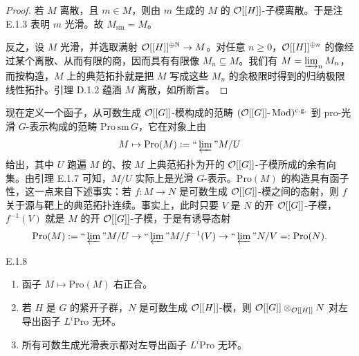 \begin{proof}
若 $M$ 离散，且 $m\in M$，则由 $m$ 生成的 $M$ 的 $\mathcal{O}[[H]]$-子模离散。于是注 E.1.3 表明 $m$ 光滑。故 $M_{\mathrm{sm}}=M$。

反之，设 $M$ 光滑，并选取满射 $\mathcal{O}[[H]]^{\oplus\mathbb{N}}\to M$。对任意 $n\ge0$，$\mathcal{O}[[H]]^{\oplus n}$ 的像经过某个离散、从而有限的商，因而具有有限像 $M_n\subseteq M$。我们有 $M=\varinjlim_n M_n$，而按构造，$M$ 上的典范拓扑就是把 $M$ 写成这些 $M_n$ 的余极限时得到的归纳极限线性拓扑。引理 D.1.2 蕴涵 $M$ 离散，如所断言。
\end{proof}

现在定义一个函子，从可数生成 $\mathcal{O}[[G]]$-模构成的范畴 $(\mathcal{O}[[G]]\text{-}\operatorname{Mod})^{\mathrm{c.g.}}$ 到 pro-光滑 $G$-表示构成的范畴 $\mathrm{Pro}\,\mathrm{sm}\,G$，它在对象上由
\[
M\mapsto\mathrm{Pro}(M):=\text{``}\varprojlim\text{''}M/U
\]
给出，其中 $U$ 跑遍 $M$ 的、按 $M$ 上典范拓扑为开的 $\mathcal{O}[[G]]$-子模所成的余有向集。由引理 E.1.7 可知，$M/U$ 实际上是光滑 $G$-表示。$\mathrm{Pro}(M)$ 的构造具有函子性，这一点来自下述事实：若 $f:M\to N$ 是可数生成 $\mathcal{O}[[G]]$-模之间的态射，则 $f$ 关于源与靶上的典范拓扑连续。事实上，此时只要 $V$ 是 $N$ 的开 $\mathcal{O}[[G]]$-子模，$f^{-1}(V)$ 就是 $M$ 的开 $\mathcal{O}[[G]]$-子模，于是有诱导态射
\[
\mathrm{Pro}(M):=\text{``}\varprojlim\text{''}M/U\to\text{``}\varprojlim\text{''}M/f^{-1}(V)\to\text{``}\varprojlim\text{''}N/V=:\mathrm{Pro}(N).
\]


\begin{prop}{E.1.8}\label{thm:a4-20-10}
\begin{enumerate}[label=(\arabic*)]
\item 函子 $M\mapsto\mathrm{Pro}(M)$ 右正合。
\item 若 $H$ 是 $G$ 的紧开子群，$N$ 是可数生成 $\mathcal{O}[[H]]$-模，则 $\mathcal{O}[[G]]\otimes_{\mathcal{O}[[H]]}N$ 对左导出函子 $L^i\mathrm{Pro}$ 无环。
\item 所有可数生成光滑表示都对左导出函子 $L^i\mathrm{Pro}$ 无环。
\end{enumerate}
\end{prop}

